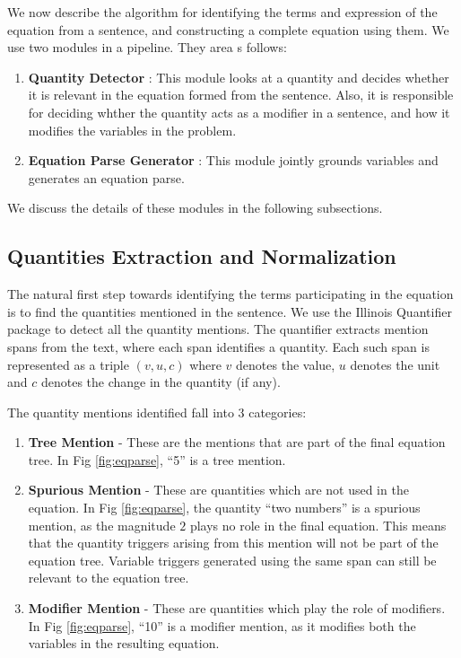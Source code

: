   We now describe the algorithm for identifying the terms and
  expression of the equation from a sentence, and constructing a
  complete equation using them. We use two modules in a pipeline. They
  area s follows:
  \begin{enumerate}
    \item \textbf{Quantity Detector} : This module looks at a quantity
      and decides whether it is relevant in the equation formed from
      the sentence. Also, it is responsible for deciding whther the
      quantity acts as a modifier in a sentence, and how it 
      modifies the variables in the problem.
      
    \item \textbf{Equation Parse Generator} : This module jointly
      grounds variables and generates an equation parse.
  \end{enumerate}

  We discuss the details of these modules in the following subsections.
  
  \subsection{Quantities Extraction and Normalization}
    The natural first step towards identifying the terms participating
    in the equation is to find the quantities mentioned in the
    sentence. We use the Illinois Quantifier package \cite{Roy} to detect
    all the quantity mentions.  The quantifier extracts mention spans
    from the text, where each span identifies a quantity. Each such
    span is represented as a triple $(v,u,c)$ where $v$ denotes the value,
    $u$ denotes the unit and $c$ denotes the change in the quantity (if
    any).

    The quantity mentions identified fall into 3 categories:
    \begin{enumerate}
    \item {\bf Tree Mention} - These are the mentions that are part of
      the final equation tree. In Fig \ref{fig:eqparse}, ``5'' is a tree
      mention.

    \item {\bf Spurious Mention} - These are quantities which are not
      used in the equation.  In Fig \ref{fig:eqparse}, the quantity
      ``two numbers'' is a spurious mention, as the magnitude $2$
      plays no role in the final equation. This means that the
      quantity triggers arising from this mention will not be part of
      the equation tree.  Variable triggers generated using the same
      span can still be relevant to the equation tree.

    \item {\bf Modifier Mention} - These are quantities which play the
      role of modifiers. In Fig \ref{fig:eqparse}, ``10'' is a
      modifier mention, as it modifies both the variables in the
      resulting equation.
    \end{enumerate}

